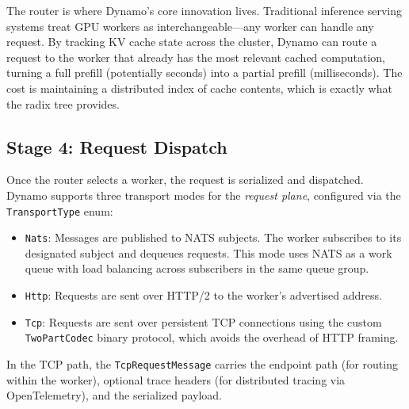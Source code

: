 \begin{insightbox}
The router is where Dynamo's core innovation lives. Traditional inference serving systems treat GPU workers as interchangeable---any worker can handle any request. By tracking KV cache state across the cluster, Dynamo can route a request to the worker that already has the most relevant cached computation, turning a full prefill (potentially seconds) into a partial prefill (milliseconds). The cost is maintaining a distributed index of cache contents, which is exactly what the radix tree provides.
\end{insightbox}

\subsection{Stage 4: Request Dispatch}

%
Once the router selects a worker, the request is serialized and dispatched. Dynamo supports three transport modes for the \emph{request plane}, configured via the \texttt{TransportType} enum:

\begin{itemize}
  \item \texttt{Nats}: Messages are published to NATS subjects. The worker subscribes to its designated subject and dequeues requests. This mode uses NATS as a work queue with load balancing across subscribers in the same queue group.
  \item \texttt{Http}: Requests are sent over HTTP/2 to the worker's advertised address.
  \item \texttt{Tcp}: Requests are sent over persistent TCP connections using the custom \texttt{TwoPartCodec} binary protocol, which avoids the overhead of HTTP framing.
\end{itemize}

In the TCP path, the \texttt{TcpRequestMessage} carries the endpoint path (for routing within the worker), optional trace headers (for distributed tracing via OpenTelemetry), and the serialized payload.

